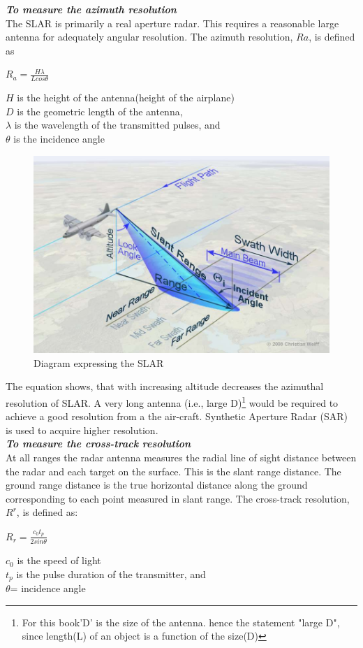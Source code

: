 \textbf{\textit{To measure the azimuth resolution}}\\
The SLAR is primarily a real aperture radar. This requires a reasonable large antenna for adequately angular resolution. The azimuth resolution, $ Ra $, is defined as
\begin{center}
$R_{a}=\frac{H \lambda}{L cos\theta}$
\end{center}
$ H $ is the height of the antenna(height of the airplane)\\
$ D $ is the geometric length of the antenna,\\
$\lambda$ is the wavelength of the transmitted pulses, and\\
$\theta$ is the incidence angle
\begin{figure}[h]
\centering
\includegraphics[scale=0.2]{./graphics/SLAR2}
\caption{Diagram expressing the SLAR}
\end{figure}

The equation shows, that with increasing altitude decreases the azimuthal resolution of SLAR. A very long antenna (i.e., large D)\footnote{For this book'D' is the size of the antenna. hence the statement "large D", since length(L) of an object is a function of the size(D)} would be required to achieve a good resolution from a the air-craft. Synthetic Aperture Radar (SAR) is used to acquire higher resolution.\\

\textit{\textbf{To measure the cross-track resolution }}\\
At all ranges the radar antenna measures the radial line of sight distance between the radar and each target on the surface. This is the slant range distance. The ground range distance is the true horizontal distance along the ground corresponding to each point measured in slant range. The cross-track resolution, $R^{r}$, is defined as:  
\begin{center}
$R_{r}=\frac{c_{0} t_{p}}{2 sin\theta}$
\end{center}
$c_{0}$ is the speed of light\\
$t_{p}$ is the pulse duration of the transmitter, and\\
$\theta$= incidence angle

